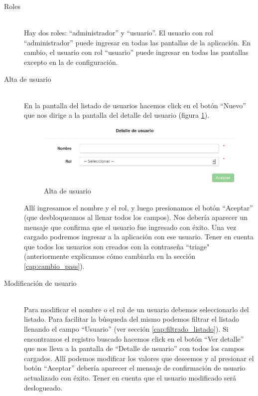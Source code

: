 \begin{description}
\item[Roles] \mbox{} \\
Hay dos roles: ``administrador'' y ``usuario''. El usuario con rol ``administrador'' puede ingresar en todas las pantallas de la aplicación. En cambio, el usuario con rol ``usuario'' puede ingresar en todas las pantallas excepto en la de configuración.

\item[Alta de usuario] \mbox{} \\
En la pantalla del listado de usuarios hacemos click en el botón ``Nuevo'' que nos dirige a la pantalla del detalle del usuario (figura \ref{fig:nuevo_usuario}).
\begin{figure}
\centerline{\includegraphics[width=1\textwidth]{nuevo_usuario.png}}
\caption{Alta de usuario}
\label{fig:nuevo_usuario}
\end{figure}
Allí ingresamos el nombre y el rol, y luego presionamos el botón ``Aceptar'' (que desbloqueamos al llenar todos los campos). Nos debería aparecer un mensaje que confirma que el usuario fue ingresado con éxito. Una vez cargado podremos ingresar a la aplicación con ese usuario. Tener en cuenta que todos los usuarios son creados con la contraseña ``triage" (anteriormente explicamos cómo cambiarla en la sección \ref{cap:cambio_pass}).

\item[Modificación de usuario] \mbox{} \\
Para modificar el nombre o el rol de un usuario debemos seleccionarlo del listado. Para facilitar la búsqueda del mismo podemos filtrar el listado llenando el campo ``Usuario'' (ver sección \ref{cap:filtrado_listado}). Si encontramos el registro buscado hacemos click en el botón ``Ver detalle'' que nos lleva a la pantalla de ``Detalle de usuario'' con todos los campos cargados. Allí podemos modificar los valores que deseemos y al presionar el botón ``Aceptar'' debería aparecer el mensaje de confirmación de usuario actualizado con éxito. Tener en cuenta que el usuario modificado será deslogueado.


\end{description}
